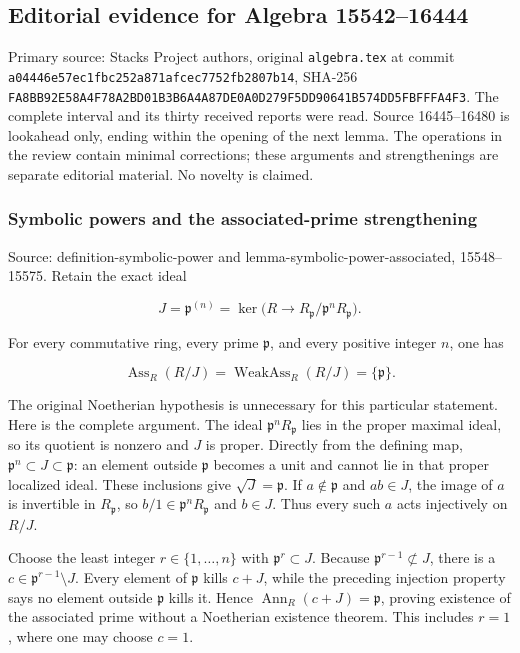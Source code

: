 \subsection{Editorial evidence for Algebra 15542--16444}\label{editorial-evidence-for-algebra-1554216444}

Primary source: Stacks Project authors, original \texttt{algebra.tex} at commit \texttt{a04446e57ec1fbc252a871afcec7752fb2807b14}, SHA-256 \texttt{FA8BB92E58A4F78A2BD01B3B6A4A87DE0A0D279F5DD90641B574DD5FBFFFA4F3}. The complete interval and its thirty received reports were read. Source 16445--16480 is lookahead only, ending within the opening of the next lemma. The operations in the review contain minimal corrections; these arguments and strengthenings are separate editorial material. No novelty is claimed.

\subsubsection{Symbolic powers and the associated-prime strengthening}\label{symbolic-powers-and-the-associated-prime-strengthening}

Source: definition-symbolic-power and lemma-symbolic-power-associated, 15548--15575. Retain the exact ideal

\[
J=\mathfrak p^{(n)}=\ker\bigl(R\longrightarrow R_{\mathfrak p}/\mathfrak p^nR_{\mathfrak p}\bigr).
\]

For every commutative ring, every prime \(\mathfrak p\), and every positive integer \(n\), one has

\[
\operatorname{Ass}_R(R/J)=\operatorname{WeakAss}_R(R/J)=\{\mathfrak p\}.
\]

The original Noetherian hypothesis is unnecessary for this particular statement. Here is the complete argument. The ideal \(\mathfrak p^nR_{\mathfrak p}\) lies in the proper maximal ideal, so its quotient is nonzero and \(J\) is proper. Directly from the defining map, \(\mathfrak p^n\subset J\subset\mathfrak p\): an element outside \(\mathfrak p\) becomes a unit and cannot lie in that proper localized ideal. These inclusions give \(\sqrt J=\mathfrak p\). If \(a\notin\mathfrak p\) and \(ab\in J\), the image of \(a\) is invertible in \(R_{\mathfrak p}\), so \(b/1\in\mathfrak p^nR_{\mathfrak p}\) and \(b\in J\). Thus every such \(a\) acts injectively on \(R/J\).

Choose the least integer \(r\in\{1,\ldots,n\}\) with \(\mathfrak p^r\subset J\). Because \(\mathfrak p^{r-1}\not\subset J\), there is a \(c\in\mathfrak p^{r-1}\setminus J\). Every element of \(\mathfrak p\) kills \(c+J\), while the preceding injection property says no element outside \(\mathfrak p\) kills it. Hence \(\operatorname{Ann}_R(c+J)=\mathfrak p\), proving existence of the associated prime without a Noetherian existence theorem. This includes \(r=1\), where one may choose \(c=1\).

